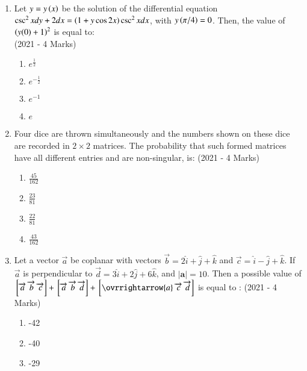 \documentclass[journal]{IEEEtran}
\begin{document}
\begin{enumerate}
{\begin{multicols}{4}
\begin{enumerate}
\item $\brak{-3,-1}$
\end{enumerate}
\end{multicols}
}
\item{
Let $y=y\left(x\right)$ be the solution of the differential equation $\csc^2x dy + 2dx = \left(1+y \cos 2x\right) \csc^2x dx$, with $y\left(\pi/4\right) = 0$. Then, the value of $\left(y(0)+1\right)^2$ is equal to:\\
\hfill
{(2021 - 4 Marks)}
\begin{multicols}{4}
\begin{enumerate}
\item $e^\frac{1}{2}$
\item $e^{-\frac{1}{2}}$
\item $e^{-1}$
\item $e$
\end{enumerate}
\end{multicols}
}
\item{
Four dice are thrown simultaneously and the numbers shown on these dice are recorded in $2\times 2$
matrices. The probability that such formed matrices have all different entries and are non-singular, is:
\hfill
{(2021 - 4 Marks)}
\begin{multicols}{4}
\begin{enumerate}
\item $\frac{45}{162}$
\item $\frac{23}{81}$
\item $\frac{22}{81}$
\item $\frac{43}{162}$
\end{enumerate}
\end{multicols}
}
\item{
Let a vector $\overrightarrow{a}$ be coplanar with vectors $\overrightarrow{b} = 2\hat{i} + \hat{j}  + \hat{k} $ and $\overrightarrow{c} = \hat{i}  - \hat{j}  + \hat{k} $. If $\overrightarrow{a}$ is perpendicular to $\overrightarrow{d} = 3\hat{i} + 2\hat{j} + 6\hat{k}$, and $|\textbf{a}| = 10$. Then a possible value of $\sbrak{\overrightarrow{a}\text{ }\overrightarrow{b}\text{ }\overrightarrow{c}}+\sbrak{\overrightarrow{a}\text{ }\overrightarrow{b}\text{ }\overrightarrow{d}}+\sbrak{\ovrrightarrow{a}\text{ }\overrightarrow{c}\text{ }\overrightarrow{d}} $ is equal to :
\hfill
{(2021 - 4 Marks)}
\begin{multicols}{4}
\begin{enumerate}
\item -42
\item -40
\item -29

\end{enumerate}
\end{multicols}}
\end{enumerate}
\end{document}
